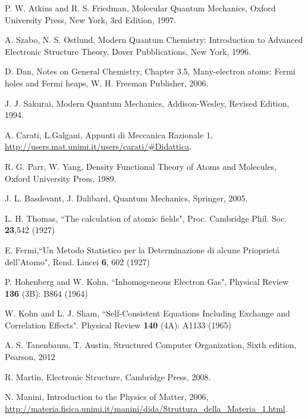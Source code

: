 \documentclass[a4paper,12pt]{article}
\begin{document}
\clearpage
{}
\begin{thebibliography}{9}


%
%

P. W. Atkins and R. S. Friedman,
Molecular Quantum Mechanics,
Oxford University Press, New York,
3rd Edition,
1997.

A. Szabo, N. S. Ostlund,
Modern Quantum Chemistry: Introduction to Advanced Electronic Structure Theory,
Dover Pubblications, New York,
1996.

D. Dan, Notes on General Chemistry,
Chapter 3.5, Many-electron atoms: Fermi holes and Fermi heaps,
W. H. Freeman Publisher,
2006.

J. J. Sakurai,
Modern Quantum Mechanics,
Addison-Wesley,
Revised Edition,
1994.

A. Carati, L.Galgani,
Appunti di Meccanica Razionale 1,
\url{http://users.mat.unimi.it/users/carati/#Didattica}.

R. G. Parr, W. Yang,
Density Functional Theory of Atoms and Molecules,
Oxford University Press,
1989.

J. L. Basdevant, J. Dalibard,
Quantum Mechanics,
Springer,
2005.


L. H. Thomas, ``The calculation of atomic fields", Proc. Cambridge Phil. Soc. \textbf{23},542 (1927)

E. Fermi,``Un Metodo Statistico per la Determinazione di alcune Priopriet\'a dell'Atomo", Rend. Lincei \textbf{6}, 602 (1927)

P. Hohenberg and W. Kohn, ``Inhomogeneous Electron Gas",  Physical Review \textbf{136} (3B): B864 (1964)

W. Kohn and L. J. Sham, ``Self-Consistent Equations Including Exchange and Correlation Effects". Physical Review \textbf{140} (4A): A1133 (1965)


A. S. Tanenbaum, T. Austin,
Structured Computer Organization,
Sixth edition,
Pearson,
2012


R. Martin, 
Electronic Structure,
Cambridge Press,
2008.

N. Manini, 
Introduction to the Physics of Matter,
2006,
\url{http://materia.fisica.unimi.it/manini/dida/Struttura_della_Materia_1.html}.

\end{thebibliography}
\end{document}
